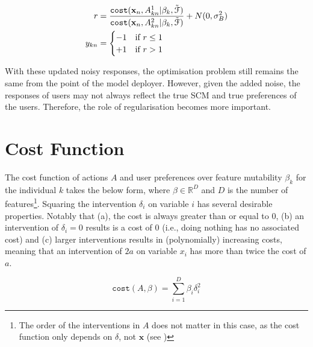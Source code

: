 \begin{align}
	r & = \frac{\operatorname*{\texttt{cost}}(\mathbf{x}_n, A^1_{kn} | \beta_k, \tilde{\mathcal{F}})}{\operatorname*{\texttt{cost}}(\mathbf{x}_n, A^2_{kn} | \beta_k, \tilde{\mathcal{F}})} + N(0, \sigma^2_B) \\ \nonumber
	y_{kn} & = \begin{cases}
			-1 & \text{if } r \leq 1 \\
			+1 & \text{if } r > 1 \\
			\end{cases}
\end{align}

With these updated noisy responses, the optimisation problem still remains the same from the point of the model deployer. However, given the added noise, the responses of users may not always reflect the true SCM and true preferences of the users. Therefore, the role of regularisation becomes more important.

\section{Cost Function}

The cost function of actions $A$ and user preferences over feature mutability $\beta_k$ for the individual $k$ takes the below form, where $\beta \in \mathbb{R}^D$ and $D$ is the number of features\footnote{The order of the interventions in $A$ does not matter in this case, as the cost function only depends on $\delta$, not $\mathbf{x}$ (see )}. Squaring the intervention $\delta_i$ on variable $i$ has several desirable properties. Notably that (a), the cost is always greater than or equal to 0, (b) an intervention of $\delta_i=0$ results is a cost of 0 (i.e., doing nothing has no associated cost) and (c) larger interventions results in (polynomially) increasing costs, meaning that an intervention of $2a$ on variable $x_i$ has more than twice the cost of $a$.

\begin{equation}
	\texttt{cost}(A, \beta) = \sum_{i=1}^D \beta_i \delta^2_i
\end{equation}
